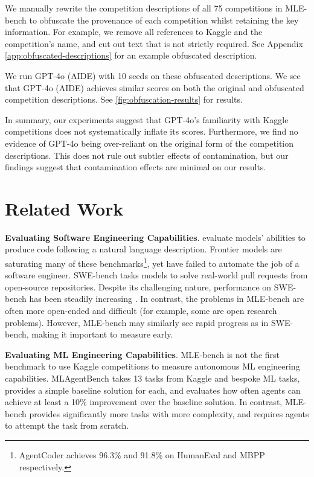 \documentclass{article} %
\begin{document}
We manually rewrite the competition descriptions of all 75 competitions in MLE-bench to obfuscate the provenance of each competition whilst retaining the key information. For example, we remove all references to Kaggle and the competition's name, and cut out text that is not strictly required. See Appendix \ref{app:obfuscated-descriptions} for an example obfuscated description.

We run GPT-4o (AIDE) with 10 seeds on these obfuscated descriptions. We see that GPT-4o (AIDE) achieves similar scores on both the original and obfuscated competition descriptions. See \autoref{fig:obfuscation-results} for results.

In summary, our experiments suggest that GPT-4o's familiarity with Kaggle competitions does not systematically inflate its scores. Furthermore, we find no evidence of GPT-4o being over-reliant on the original form of the competition descriptions. This does not rule out subtler effects of contamination, but our findings suggest that contamination effects are minimal on our results.

\section{Related Work}
\label{sec:related_work}

\textbf{Evaluating Software Engineering Capabilities}. \cite{chen_evaluating_2021, hendrycks_measuring_2021, austin_program_2021, jain_livecodebench_2024} evaluate models' abilities to produce code following a natural language description. Frontier models are saturating many of these benchmarks\footnote{AgentCoder \citep{huang_agentcoder_2024} achieves 96.3\% and 91.8\% on HumanEval and MBPP respectively.}, yet have failed to automate the job of a software engineer. SWE-bench \citep{jimenez_swe-bench_2024} tasks models to solve real-world pull requests from open-source repositories. Despite its challenging nature, performance on SWE-bench has been steadily increasing \citep{zhang_autocoderover_2024, factoryai_code_2024}. In contrast, the problems in MLE-bench are often more open-ended and difficult (for example, some are open research problems). However, MLE-bench may similarly see rapid progress as in SWE-bench, making it important to measure early.

\textbf{Evaluating ML Engineering Capabilities}.
MLE-bench is not the first benchmark to use Kaggle competitions to measure autonomous ML engineering capabilities.
MLAgentBench \citep{huang_mlagentbench_2024} takes 13 tasks from Kaggle and bespoke ML tasks, provides a simple baseline solution for each, and evaluates how often agents can achieve at least a 10\% improvement over the baseline solution. In contrast, MLE-bench provides significantly more tasks with more complexity, and requires agents to attempt the task from scratch.
\end{document}
